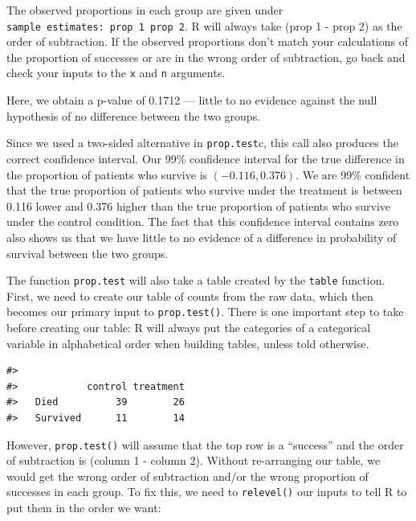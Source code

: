 \documentclass[
  10pt,
  openany]{book}
\newenvironment{Shaded}{\begin{snugshade}}{\end{snugshade}}
\newcommand{\FunctionTok}[1]{\textcolor[rgb]{0.13,0.29,0.53}{\textbf{#1}}}
\newcommand{\NormalTok}[1]{#1}
\newcommand{\OtherTok}[1]{\textcolor[rgb]{0.56,0.35,0.01}{#1}}
\newcommand{\SpecialCharTok}[1]{\textcolor[rgb]{0.81,0.36,0.00}{\textbf{#1}}}
\theoremstyle{definition}
\theoremstyle{definition}
\theoremstyle{definition}
\theoremstyle{definition}
\theoremstyle{remark}
\begin{document}
The observed proportions in each group are given under \texttt{sample\ estimates:\ prop\ 1\ prop\ 2}. R will always take (prop 1 - prop 2) as the order of subtraction. If the observed proportions don't match your calculations of the proportion of successes or are in the wrong order of subtraction, go back and check your inputs to the \texttt{x} and \texttt{n} arguments.

Here, we obtain a p-value of 0.1712 --- little to no evidence against the null hypothesis of no difference between the two groups.

Since we used a two-sided alternative in \texttt{prop.test}c, this call also produces the correct confidence interval. Our 99\% confidence interval for the true difference in the proportion of patients who survive is \((-0.116, 0.376)\). We are 99\% confident that the true proportion of patients who survive under the treatment is between 0.116 lower and 0.376 higher than the true proportion of patients who survive under the control condition. The fact that this confidence interval contains zero also shows us that we have little to no evidence of a difference in probability of survival between the two groups.

The function \texttt{prop.test} will also take a table created by the \texttt{table} function. First, we need to create our table of counts from the raw data, which then becomes our primary input to \texttt{prop.test()}. There is one important step to take before creating our table: R will always put the categories of a categorical variable in alphabetical order when building tables, unless told otherwise.

\begin{Shaded}
\end{Shaded}

\begin{verbatim}
#>           
#>            control treatment
#>   Died          39        26
#>   Survived      11        14
\end{verbatim}

However, \texttt{prop.test()} will assume that the top row is a ``success'' and the order of subtraction is (column 1 - column 2). Without re-arranging our table, we would get the wrong order of subtraction and/or the wrong proportion of successes in each group. To fix this, we need to \texttt{relevel()} our inputs to tell R to put them in the order we want:
\end{document}
